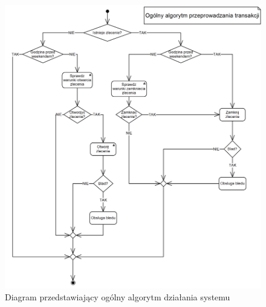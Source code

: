 \documentclass[pdflatex,11pt]{aghdpl}
\begin{document}
\begin{figure}[ht]
\begin{center}
\includegraphics[width=16cm]{ogolny.png}
\caption{Diagram przedstawiający ogólny algorytm działania systemu}
\label{ogolny}
\end{center}
\end{figure} 
\end{document}
